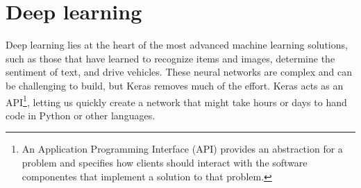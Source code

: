 \section{Deep learning}
\label{sec:deeplearning}
%
Deep learning lies at the heart of the most advanced machine learning solutions,
such as those that have learned to recognize items and images, determine the
sentiment of text, and drive vehicles. 
These neural networks are complex and can be challenging to build, but Keras 
removes much of the effort.
Keras acts as an API\footnote{An Application Programming Interface (API) 
provides an abstraction for a problem and specifies how clients should interact 
with the software componentes that implement a solution to that
problem.\cite{api}}, 
letting us quickly create a network that might take hours or days to hand code 
in Python or other languages.
%
